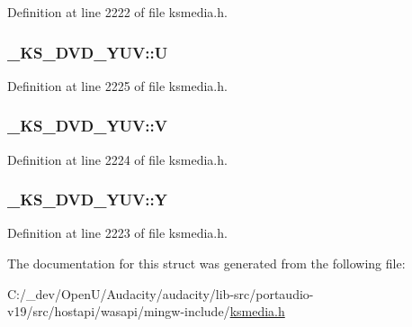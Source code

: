 Definition at line 2222 of file ksmedia.\+h.

\subsubsection[{\texorpdfstring{U}{U}}]{ \+\_\+\+K\+S\+\_\+\+D\+V\+D\+\_\+\+Y\+U\+V\+::U}\hypertarget{struct___k_s___d_v_d___y_u_v_a8eaf7b9af2e7bbbabfbd37bd267b42bd}{}\label{struct___k_s___d_v_d___y_u_v_a8eaf7b9af2e7bbbabfbd37bd267b42bd}


Definition at line 2225 of file ksmedia.\+h.

\subsubsection[{\texorpdfstring{V}{V}}]{ \+\_\+\+K\+S\+\_\+\+D\+V\+D\+\_\+\+Y\+U\+V\+::V}\hypertarget{struct___k_s___d_v_d___y_u_v_afe2aff1118fe00888a7b3e8ea3442caa}{}\label{struct___k_s___d_v_d___y_u_v_afe2aff1118fe00888a7b3e8ea3442caa}


Definition at line 2224 of file ksmedia.\+h.

\subsubsection[{\texorpdfstring{Y}{Y}}]{ \+\_\+\+K\+S\+\_\+\+D\+V\+D\+\_\+\+Y\+U\+V\+::Y}\hypertarget{struct___k_s___d_v_d___y_u_v_a64e006d26034d45e0e8dd728c8193c58}{}\label{struct___k_s___d_v_d___y_u_v_a64e006d26034d45e0e8dd728c8193c58}


Definition at line 2223 of file ksmedia.\+h.



The documentation for this struct was generated from the following file\+:\begin{DoxyCompactItemize}
\item 
C\+:/\+\_\+dev/\+Open\+U/\+Audacity/audacity/lib-\/src/portaudio-\/v19/src/hostapi/wasapi/mingw-\/include/\hyperlink{ksmedia_8h}{ksmedia.\+h}\end{DoxyCompactItemize}

